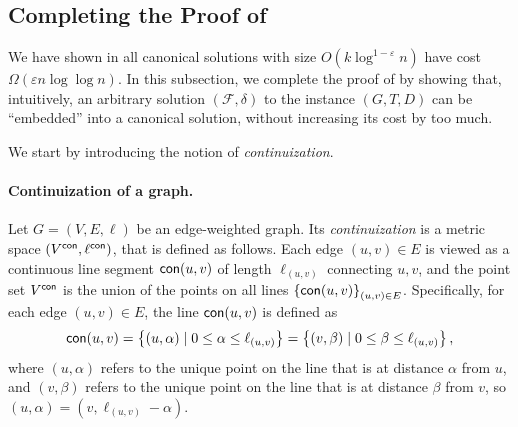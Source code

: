 \documentclass[11pt]{article}
\theoremstyle{definition}
\newcommand{\set}[1]{\left\{ #1 \right\}}
\newcommand{\fset}{{\mathcal{F}}}
\newcommand{\eps}{{\varepsilon}}
\begin{document}
\newcommand{\dia}{\textsf{diam}}
\newcommand{\girth}{g}
\newcommand{\con}{\textnormal{\textsf{con}}}
\newcommand{\lcon}{\ell^{\con}}
\newcommand{\Vcon}{V^{\con}}
\subsection{Completing the Proof of }
\label{subsec: mapping}

We have shown in  all canonical solutions with size $O(k\log^{1-\eps} n)$ have cost $\Omega(\eps n\log\log n)$. In this subsection, we complete the proof of  by showing that, intuitively, an arbitrary solution $(\fset,\delta)$ to the instance $(G,T,D)$ can be ``embedded'' into a canonical solution, without increasing its cost by too much. 

We start by introducing the notion of \emph{continuization}.

\paragraph{Continuization of a graph.}
Let $G=(V,E,\ell)$ be an edge-weighted graph. Its \emph{continuization} is a metric space $(V^{\con},\ell^{\con})$, that is defined as follows. 
Each edge $(u,v)\in E$ is viewed as a continuous line segment $\con(u,v)$ of length $\ell_{(u,v)}$ connecting $u,v$, and the point set $V^{\con}$ is the union of the points on all lines $\set{\con(u,v)}_{(u,v)\in E}$. 
Specifically, for each edge $(u,v)\in E$, the line $\con(u,v)$ is defined as \[\con(u,v)=\set{(u,\alpha)\mid 0\le \alpha\le \ell_{(u,v)}}=\set{(v,\beta)\mid 0\le \beta\le \ell_{(u,v)}},\]
where $(u,\alpha)$ refers to the unique point on the line that is at distance $\alpha$ from $u$, and $(v,\beta)$ refers to the unique point on the line that is at distance $\beta$ from $v$, so $(u,\alpha)=(v,\ell_{(u,v)}-\alpha)$.
\end{document}
